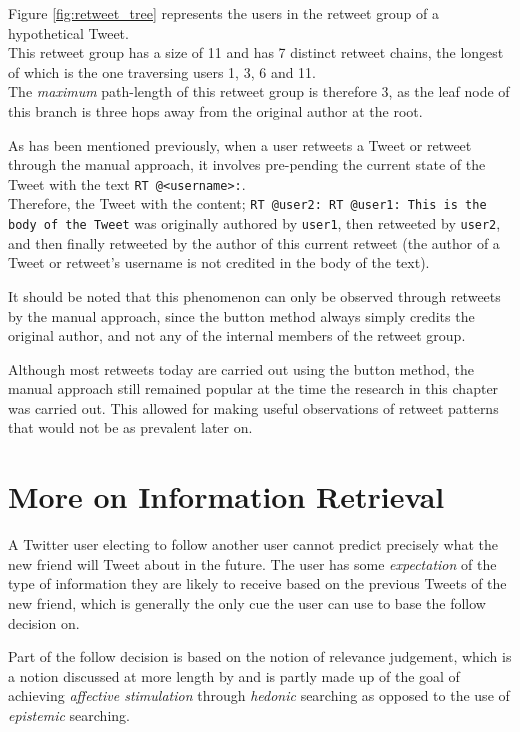 Figure \ref{fig:retweet_tree} represents the users in the retweet group of a hypothetical Tweet.\\
This retweet group has a size of 11 and has 7 distinct retweet chains, the longest of which is the one traversing users 1, 3, 6 and 11.\\
The \textit{maximum} path-length of this retweet group is therefore 3, as the leaf node of this branch is three hops away from the original author at the root.

As has been mentioned previously, when a user retweets a Tweet or retweet through the manual approach, it involves pre-pending the current state of the Tweet with the text \texttt{RT @<username>:}.\\
Therefore, the Tweet with the content;\newline
\texttt{RT @user2: RT @user1: This is the body of the Tweet}\newline
was originally authored by \texttt{user1}, then retweeted by \texttt{user2}, and then finally retweeted by the author of this current retweet (the author of a Tweet or retweet's username is not credited in the body of the text).

It should be noted that this phenomenon can only be observed through retweets by the manual approach, since the button method always simply credits the original author, and not any of the internal members of the retweet group.

Although most retweets today are carried out using the button method, the manual approach still remained popular at the time the research in this chapter was carried out. This allowed for making useful observations of retweet patterns that would not be as prevalent later on.


\section{More on Information Retrieval}
A Twitter user electing to follow another user cannot predict precisely what the new friend will Tweet about in the future. The user has some \textit{expectation} of the type of information they are likely to receive based on the previous Tweets of the new friend, which is generally the only cue the user can use to base the follow decision on.

Part of the follow decision is based on the notion of relevance judgement, which is a notion discussed at more length by \cite{xu07} and is partly made up of the goal of achieving \textit{affective stimulation} through \textit{hedonic} searching as opposed to the use of \textit{epistemic} searching.


